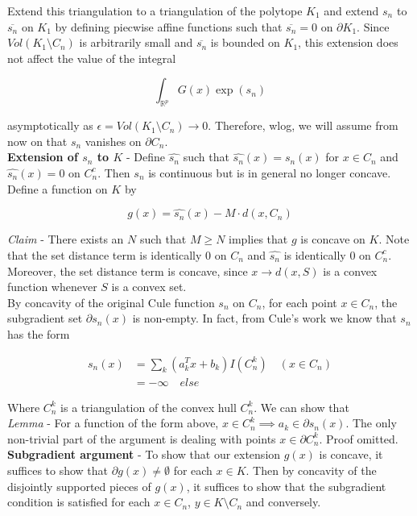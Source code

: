 \documentclass[11pt,reqno]{amsart}
\theoremstyle{definition}
\numberwithin{equation}{section}
\newcommand{\eps}{\epsilon}
\newcommand{\wh}{\widehat}
\newcommand{\mr}{\mathbb{R}}
\newcommand{\tb}{\textbf}
\newcommand{\pa}{\partial}
\newcommand{\ov}{\overline}
\begin{document}
Extend this triangulation to a triangulation of the polytope $K_1$ and extend $s_n$ to $\ov{s_n}$ on $K_1$ by defining piecwise affine functions such that $\ov{s_n} = 0$ on $\pa K_1$. Since $Vol(K_1 \setminus C_n)$ is arbitrarily small and $\ov{s_n}$ is bounded on $K_1$, this extension does not affect the value of the integral 

\[
\int_{\mr^p} G(x) \exp(s_n) 
\]

asymptotically as $\eps = Vol(K_1 \setminus C_n) \to 0$. Therefore, wlog, we will assume from now on that $s_n$ vanishes on $\pa C_n$. \\

\tb{Extension of $s_n$ to $K$} - Define $\wh{s_n}$ such that $\wh{s_n}(x) = s_n(x)$ for $x \in C_n$ and $\wh{s_n}(x) = 0$ on $C_n^c$. Then $s_n$ is continuous but is in general no longer concave. Define a function on $K$ by 

\[
g(x) = \wh{s_n}(x) - M \cdot d(x,C_n) 
\]

\emph{Claim} - There exists an $N$ such that $M \geq N$ implies that $g$ is concave on $K$. Note that the set distance term is identically $0$ on $C_n$ and $\wh{s_n}$ is identically $0$ on $C_n^c$. Moreover, the set distance term is concave, since $x \to d(x,S)$ is a convex function whenever $S$ is a convex set. \\

By concavity of the original Cule function $s_n$ on $C_n$, for each point $x \in C_n$, the subgradient set $\pa s_n(x)$ is non-empty. In fact, from Cule's work we know that $s_n$ has the form 

\begin{align*}
s_n(x) &= \sum_k (a_k^T x + b_k) I(C_n^k) \quad (x \in C_n) \\
&= - \infty \quad else
\end{align*}

Where $C_n^k$ is a triangulation of the convex hull $C_n^k$. We can show that \\

\emph{Lemma} - For a function of the form above, $x \in C_n^k \implies a_k \in \pa s_n(x)$. The only non-trivial part of the argument is dealing with points $x \in \pa C_n^k$. Proof omitted. \\

\tb{Subgradient argument} - To show that our extension $g(x)$ is concave, it suffices to show that $\pa g(x) \not = \emptyset$ for each $x \in K$. Then by concavity of the disjointly supported pieces of $g(x)$, it suffices to show that the subgradient condition is satisfied for each $x \in C_n$, $y \in K \setminus C_n$ and conversely. \\
\end{document}
